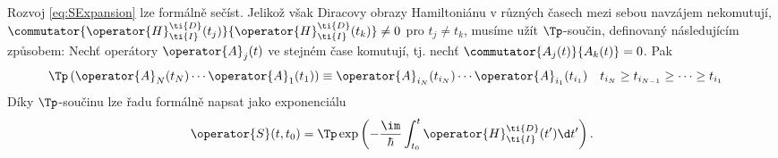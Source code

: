Rozvoj \eqref{eq:SExpansion} lze formálně sečíst.
Jelikož však Diracovy obrazy Hamiltoniánu v různých časech mezi sebou navzájem nekomutují, $\commutator{\operator{H}^{\ti{D}}_{\ti{I}}(t_{j})}{\operator{H}^{\ti{D}}_{\ti{I}}(t_{k})}\neq0$ pro $t_{j}\neq t_{k}$, musíme užít $\Tp$-součin, definovaný následujícím způsobem:
Nechť operátory $\operator{A}_{j}(t)$ ve stejném čase komutují, tj. nechť $\commutator{A_{j}(t)}{A_{k}(t)}=0$.
Pak
\begin{align}
    \Tp\left(\operator{A}_{N}(t_{N})\dotsm\operator{A}_{1}(t_{1})\right)
        &\equiv\operator{A}_{i_{N}}(t_{i_{N}})\dotsm\operator{A}_{i_{1}}(t_{i_{1}})
        &&t_{i_{N}}\geq t_{i_{N-1}}\geq\dotsb\geq t_{i_{1}}
\end{align}
Díky $\Tp$-součinu lze řadu formálně napsat jako exponenciálu
\begin{equation}
    \operator{S}(t,t_{0})
        =\Tp\exp\left(-\frac{\im}{\hbar}\int_{t_{0}}^{t}\operator{H}_{\ti{I}}^{\ti{D}}(t')\d t'\right).
\end{equation}
